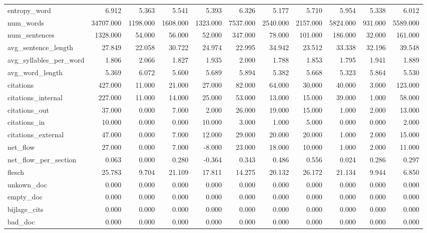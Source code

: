\begin{tabular}{lrrrrrrrrrr}
\cline{1-11}
entropy\_word & 6.912 & 5.363 & 5.541 & 5.393 & 6.326 & 5.177 & 5.710 & 5.954 & 5.338 & 6.012 \\
\cline{1-11}
num\_words & 34707.000 & 1198.000 & 1608.000 & 1323.000 & 7537.000 & 2540.000 & 2157.000 & 5824.000 & 931.000 & 5589.000 \\
\cline{1-11}
num\_sentences & 1328.000 & 54.000 & 56.000 & 52.000 & 347.000 & 78.000 & 101.000 & 186.000 & 32.000 & 161.000 \\
\cline{1-11}
avg\_sentence\_length & 27.849 & 22.058 & 30.722 & 24.974 & 22.995 & 34.942 & 23.512 & 33.338 & 32.196 & 39.548 \\
\cline{1-11}
avg\_syllables\_per\_word & 1.806 & 2.066 & 1.827 & 1.935 & 2.000 & 1.788 & 1.853 & 1.795 & 1.941 & 1.889 \\
\cline{1-11}
avg\_word\_length & 5.369 & 6.072 & 5.600 & 5.689 & 5.894 & 5.382 & 5.668 & 5.323 & 5.864 & 5.530 \\
\cline{1-11}
citations & 427.000 & 11.000 & 21.000 & 27.000 & 82.000 & 64.000 & 30.000 & 40.000 & 3.000 & 123.000 \\
\cline{1-11}
citations\_internal & 227.000 & 11.000 & 14.000 & 25.000 & 53.000 & 13.000 & 15.000 & 39.000 & 1.000 & 58.000 \\
\cline{1-11}
citations\_out & 37.000 & 0.000 & 7.000 & 2.000 & 26.000 & 19.000 & 15.000 & 1.000 & 2.000 & 13.000 \\
\cline{1-11}
citations\_in & 10.000 & 0.000 & 0.000 & 10.000 & 3.000 & 1.000 & 5.000 & 0.000 & 0.000 & 2.000 \\
\cline{1-11}
citations\_external & 47.000 & 0.000 & 7.000 & 12.000 & 29.000 & 20.000 & 20.000 & 1.000 & 2.000 & 15.000 \\
\cline{1-11}
net\_flow & 27.000 & 0.000 & 7.000 & -8.000 & 23.000 & 18.000 & 10.000 & 1.000 & 2.000 & 11.000 \\
\cline{1-11}
net\_flow\_per\_section & 0.063 & 0.000 & 0.280 & -0.364 & 0.343 & 0.486 & 0.556 & 0.024 & 0.286 & 0.297 \\
\cline{1-11}
flesch & 25.783 & 9.704 & 21.109 & 17.811 & 14.275 & 20.132 & 26.172 & 21.134 & 9.944 & 6.850 \\
\cline{1-11}
unkown\_doc & 0.000 & 0.000 & 0.000 & 0.000 & 0.000 & 0.000 & 0.000 & 0.000 & 0.000 & 0.000 \\
\cline{1-11}
empty\_doc & 0.000 & 0.000 & 0.000 & 0.000 & 0.000 & 0.000 & 0.000 & 0.000 & 0.000 & 0.000 \\
\cline{1-11}
bijlage\_cits & 0.000 & 0.000 & 0.000 & 0.000 & 0.000 & 0.000 & 0.000 & 0.000 & 0.000 & 0.000 \\
\cline{1-11}
bad\_doc & 0.000 & 0.000 & 0.000 & 0.000 & 0.000 & 0.000 & 0.000 & 0.000 & 0.000 & 0.000 \\
\cline{1-11}
\bottomrule
\end{tabular}
